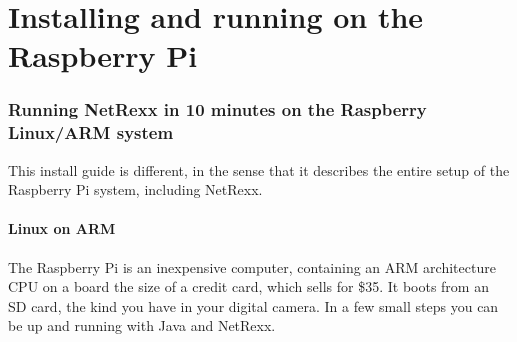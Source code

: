 \chapter{Installing and running on the Raspberry Pi}
\subsection{Running NetRexx in 10 minutes on the Raspberry Linux/ARM system}
This install guide is different, in the sense that it describes the entire setup of the Raspberry Pi system, including NetRexx.

\subsubsection{Linux on ARM}
The Raspberry Pi is an inexpensive computer, containing an ARM architecture CPU on a board the size of a credit card, which sells for \$35. It boots from an SD card, the kind you have in your digital camera. In a few small steps you can be up and running with Java and NetRexx. 
